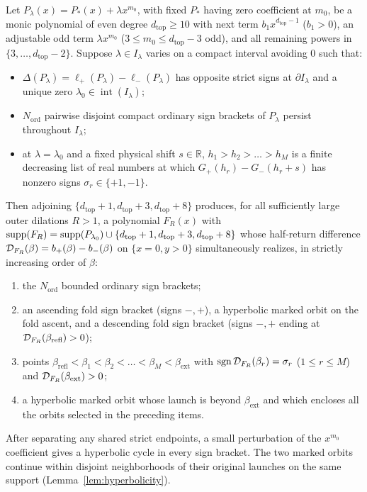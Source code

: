 \begin{proposition}\label{prop:fold-closure}
Let $P_\lambda(x)=P_*(x)+\lambda x^{m_0}$, with fixed $P_*$ having zero coefficient at $m_0$, be a
monic polynomial of even degree $d_{\mathrm{top}}\ge 10$ with next term $b_1 x^{d_{\mathrm{top}}-1}$
($b_1>0$), an adjustable odd term $\lambda x^{m_0}$ ($3\le m_0\le d_{\mathrm{top}}-3$ odd), and all
remaining powers in $\{3,\dots,d_{\mathrm{top}}-2\}$. Suppose $\lambda\in I_\lambda$ varies on a
compact interval avoiding $0$ such that:
\begin{itemize}
  \item $\Delta(P_\lambda)=\ell_+(P_\lambda)-\ell_-(P_\lambda)$ has opposite strict signs at $\partial
  I_\lambda$ and a unique zero $\lambda_0\in\operatorname{int}(I_\lambda)$;
  \item $N_{\mathrm{ord}}$ pairwise disjoint compact ordinary sign brackets of $P_\lambda$ persist throughout $I_\lambda$;
  \item at $\lambda=\lambda_0$ and a fixed physical shift $s\in\mathbb{R}$, $h_1>h_2>\dots>h_M$ is a
  finite decreasing list of real numbers at which $G_+(h_r)-G_-(h_r+s)$ has nonzero signs
  $\sigma_r\in\{+1,-1\}$.
\end{itemize}
Then adjoining $\{d_{\mathrm{top}}+1,d_{\mathrm{top}}+3,d_{\mathrm{top}}+8\}$ produces, for all
sufficiently large outer dilations $R>1$, a polynomial $F_R(x)$ with
$\operatorname{supp}(F_R)=\operatorname{supp}(P_{\lambda_0})\cup\{d_{\mathrm{top}}+1,d_{\mathrm{top}}+3,d_{\mathrm{top}}+8\}$
whose half-return difference $\mathcal{D}_{F_R}(\beta)=b_+(\beta)-b_-(\beta)$ on $\{x=0,y>0\}$
simultaneously realizes, in strictly increasing order of $\beta$:
\begin{enumerate}
  \item the $N_{\mathrm{ord}}$ bounded ordinary sign brackets;
  \item an ascending fold sign bracket (signs $-,+$), a hyperbolic marked orbit on the fold ascent,
  and a descending fold sign bracket (signs $-,+$ ending at $\mathcal{D}_{F_R}(\beta_{\mathrm{refl}})>0$);
  \item points $\beta_{\mathrm{refl}}<\beta_1<\beta_2<\dots<\beta_M<\beta_{\mathrm{ext}}$ with
  $\operatorname{sgn}\mathcal{D}_{F_R}(\beta_r)=\sigma_r$ ($1\le r\le M$) and $\mathcal{D}_{F_R}(\beta_{\mathrm{ext}})>0$;
  \item a hyperbolic marked orbit whose launch is beyond $\beta_{\mathrm{ext}}$
  and which encloses all the orbits selected in the preceding items.
\end{enumerate}
After separating any shared strict endpoints, a small perturbation of the
$x^{m_0}$ coefficient gives a hyperbolic cycle in every sign bracket.
The two marked orbits continue within disjoint neighborhoods of their
original launches on the same support (Lemma~\ref{lem:hyperbolicity}).
\end{proposition}

